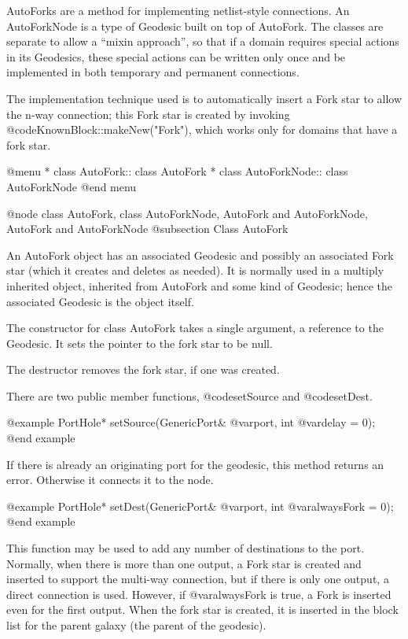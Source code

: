 AutoForks are a method for implementing netlist-style connections.
An AutoForkNode is a type of Geodesic built on top of AutoFork.
The classes are separate to allow a ``mixin approach'', so that if
a domain requires special actions in its Geodesics, these special
actions can be written only once and be implemented in both
temporary and permanent connections.

The implementation technique used is to automatically insert a Fork
star to allow the n-way connection; this Fork star is created by
invoking @code{KnownBlock::makeNew("Fork")}, which works only for
domains that have a fork star.

@menu
* class AutoFork::              class AutoFork
* class AutoForkNode::          class AutoForkNode
@end menu

@node class AutoFork, class AutoForkNode, AutoFork and AutoForkNode, AutoFork and AutoForkNode
@subsection Class AutoFork

An AutoFork object has an associated Geodesic and possibly an associated
Fork star (which it creates and deletes as needed).  It is normally used
in a multiply inherited object, inherited from AutoFork and some kind
of Geodesic; hence the associated Geodesic is the object itself.

The constructor for class AutoFork takes a single argument, a reference
to the Geodesic.  It sets the pointer to the fork star to be null.

The destructor removes the fork star, if one was created.

There are two public member functions, @code{setSource} and
@code{setDest}.

@example
PortHole* setSource(GenericPort& @var{port}, int @var{delay} = 0);
@end example

If there is already an originating port for the geodesic, this method
returns an error.  Otherwise it connects it to the node.

@example
PortHole* setDest(GenericPort& @var{port}, int @var{alwaysFork} = 0);
@end example

This function may be used to add any number of destinations to the
port.  Normally, when there is more than one output, a Fork star is
created and inserted to support the multi-way connection, but if there
is only one output, a direct connection is used.  However, if
@var{alwaysFork} is true, a Fork is inserted even for the first output.
When the fork star is created, it is inserted in the block list for
the parent galaxy (the parent of the geodesic).

